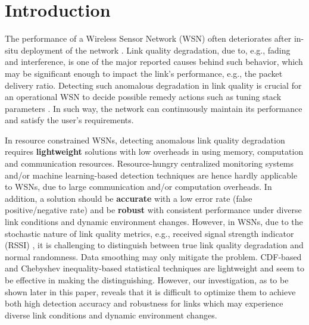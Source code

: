 \section{Introduction}\label{sec:intro}

The performance of a Wireless Sensor Network (WSN) often deteriorates after in-situ deployment of the network \cite{1182885, 4408504, 6850017, 6661323}. Link quality degradation, due to, e.g., fading and interference, is one of the major reported causes behind such behavior, which may be significant enough to impact the link's performance, e.g., the packet delivery ratio. Detecting such anomalous degradation in link quality is crucial for an operational WSN to decide possible remedy actions such as tuning stack parameters \cite{Lin:atpc, 7164923}. In such way, the network can continuously maintain its performance and satisfy the user's requirements. 

%


In resource constrained WSNs, detecting anomalous link quality degradation requires {\bf lightweight} solutions with low overheads in using memory, computation and communication resources. Resource-hungry centralized monitoring systems \cite{6661323, 1367278, 1267061} and/or machine learning-based detection techniques \cite{4085803, 4289308, 5356174} are hence hardly applicable to WSNs, due to large communication and/or computation overheads. In addition, a solution should be {\bf accurate} with a low error rate (false positive/negative rate) and be {\bf robust} with consistent performance under diverse link conditions and dynamic environment changes. However, in WSNs, due to the stochastic nature of link quality metrics, e.g., received signal strength indicator (RSSI) \cite{2893729}, it is challenging to distinguish between true link quality degradation and normal randomness. Data smoothing\cite{6199865} may only mitigate the problem. CDF-based \cite{4068315, 6199865} and Chebyshev inequality-based \cite{1689248, 1592596, 1515559} statistical techniques are lightweight and seem to be effective in making the distinguishing. However, our investigation, as to be shown later in this paper, reveals that it is difficult to optimize them to achieve both high detection accuracy and robustness for links which may experience diverse link conditions and dynamic environment changes. 

